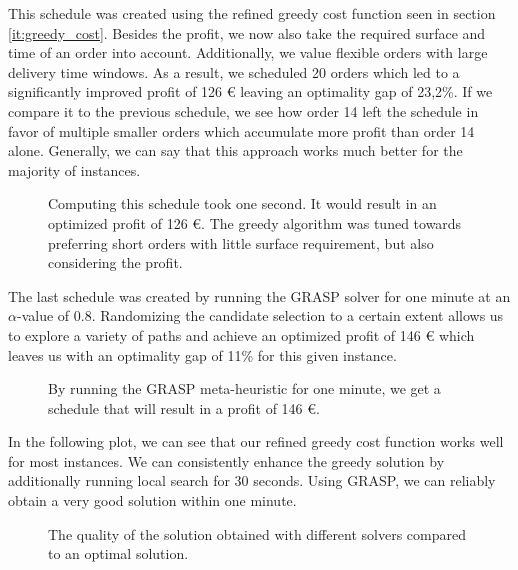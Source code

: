 \documentclass{article}
\begin{document}
This schedule was created using the refined greedy cost function seen in section \ref{it:greedy_cost}. Besides the profit, we now also take the required surface and time of an order into account. Additionally, we value flexible orders with large delivery time windows. As a result, we scheduled 20 orders which led to a significantly improved profit of 126 \euro{} leaving an optimality gap of 23,2\%. If we compare it to the previous schedule, we see how order 14 left the schedule in favor of multiple smaller orders which accumulate more profit than order 14 alone. Generally, we can say that this approach works much better for the majority of instances.
\begin{figure}[H]
\centering

\caption[Example of an Approximated Schedule based on an Advanced Cost Function]{Computing this schedule took one second. It would result in an optimized profit of 126 \euro{}. The greedy algorithm was tuned towards preferring short orders with little surface requirement, but also considering the profit.}
\label{fig:125_schedule_approx}
\end{figure}


The last schedule was created by running the GRASP solver for one minute at an $\alpha$-value of 0.8. Randomizing the candidate selection to a certain extent allows us to explore a variety of paths and achieve an optimized profit of 146 \euro{} which leaves us with an optimality gap of 11\% for this given instance.
\begin{figure}[H]
\centering

\caption[Example of an Approximated Schedule using GRASP]{By running the GRASP meta-heuristic for one minute, we get a schedule that will result in a profit of 146 \euro{}.}
\label{fig:125_schedule_approx_grasp}
\end{figure}


In the following plot, we can see that our refined greedy cost function works well for most instances. We can consistently enhance the greedy solution by additionally running local search for 30 seconds. Using GRASP, we can reliably obtain a very good solution within one minute.
\begin{figure}[H]
\centering

\caption[Solution Quality]{The quality of the solution obtained with different solvers compared to an optimal solution.}
\label{fig:timequality}
\end{figure}
\end{document}
